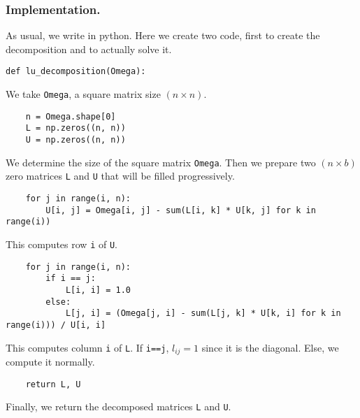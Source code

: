 \documentclass[../../../main.tex]{subfiles}
\begin{document}
\subsubsection{Implementation.}
As usual, we write in python.
Here we create two code, first to create the decomposition and to actually solve it.
\begin{verbatim}
def lu_decomposition(Omega):
\end{verbatim}
We take \verb|Omega|, a square matrix size $(n \times n)$.
\begin{verbatim}
    n = Omega.shape[0]
    L = np.zeros((n, n))
    U = np.zeros((n, n))
\end{verbatim}
We determine the size of the square matrix \verb|Omega|.
Then we prepare two $(n \times  b)$ zero matrices \verb|L| and \verb|U| that will be filled progressively.
\begin{verbatim}
    for j in range(i, n):
        U[i, j] = Omega[i, j] - sum(L[i, k] * U[k, j] for k in range(i))
\end{verbatim}
This computes row \verb|i| of \verb|U|.
\begin{verbatim}
    for j in range(i, n):
        if i == j:
            L[i, i] = 1.0
        else:
            L[j, i] = (Omega[j, i] - sum(L[j, k] * U[k, i] for k in range(i))) / U[i, i]
\end{verbatim}
This computes column \verb|i| of \verb|L|.
If \verb|i==j|, $l_{ij}=1$ since it is the diagonal.
Else, we compute it normally.
\begin{verbatim}
    return L, U
\end{verbatim}
Finally, we return the decomposed matrices \verb|L| and \verb|U|.
\end{document}
